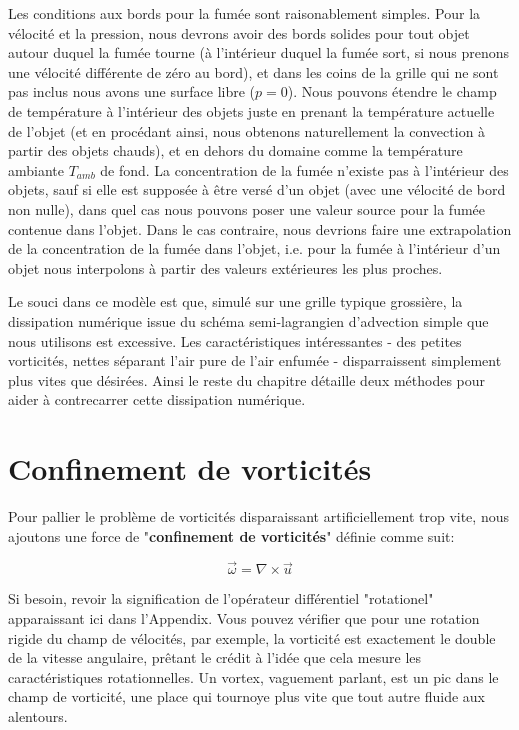 \documentclass[11pt]{report}
\begin{document}
Les conditions aux bords pour la fumée sont raisonablement simples. Pour la vélocité et la pression, nous devrons avoir des bords solides pour tout objet autour duquel la fumée tourne (à l'intérieur duquel la fumée sort, si nous prenons une vélocité différente de zéro au bord), et dans les coins de la grille qui ne sont pas inclus nous avons une surface libre ($p=0$). Nous pouvons étendre le champ de température à l'intérieur des objets juste en prenant la température actuelle de l'objet (et en procédant ainsi, nous obtenons naturellement la convection à partir des objets chauds), et en dehors du domaine comme la température ambiante $T_{amb}$ de fond. La concentration de la fumée n'existe pas à l'intérieur des objets, sauf si elle est supposée à être versé d'un objet (avec une vélocité de bord non nulle), dans quel cas nous pouvons poser une valeur source pour la fumée contenue dans l'objet. Dans le cas contraire, nous devrions faire une extrapolation de la concentration de la fumée dans l'objet, i.e. pour la fumée à l'intérieur d'un objet nous interpolons à partir des valeurs extérieures les plus proches.\newline

Le souci dans ce modèle est que, simulé sur une grille typique grossière, la dissipation numérique issue du schéma semi-lagrangien d'advection simple que nous utilisons est excessive. Les caractéristiques intéressantes - des petites vorticités, nettes séparant l'air pure de l'air enfumée - disparraissent simplement plus vites que désirées. Ainsi le reste du chapitre détaille deux méthodes pour aider à contrecarrer cette dissipation numérique.

\section{Confinement de vorticités}   

Pour pallier le problème de vorticités disparaissant artificiellement trop vite, nous ajoutons une force de "\textbf{confinement de vorticités}" définie comme suit:

\begin{equation}
\overrightarrow{\omega} = \nabla \times \overrightarrow{u}
\end{equation}

Si besoin, revoir la signification de l'opérateur différentiel "rotationel" apparaissant ici dans l'Appendix. Vous pouvez vérifier que pour une rotation rigide du champ de vélocités, par exemple, la vorticité est exactement le double de la vitesse angulaire, prêtant le crédit à l'idée que cela mesure les caractéristiques rotationnelles. Un vortex, vaguement parlant, est un pic dans le champ de vorticité, une place qui tournoye plus vite que tout autre fluide aux alentours.\newline
\end{document}
